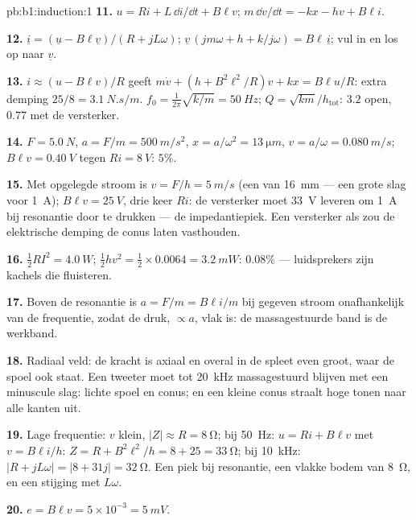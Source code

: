 \begin{solution}{pb:b1:induction:1}
\textbf{11.} $u = Ri + L\,\dd i/\dd t + B\ell v$; $m\,\dd v/\dd t = -kx - hv + B\ell i$.

\textbf{12.} $\underline i = (\underline u - B\ell\underline v)/(R + jL\omega)$; $\underline v\,(jm\omega + h +
k/j\omega) = B\ell\,\underline i$; vul in en los op naar $\underline v$.

\textbf{13.} $i \approx (u - B\ell v)/R$ geeft $m\dot v + (h + B^2\ell^2/R)v + kx =
B\ell u/R$: extra demping $25/8 = \qty{3.1}{N.s/m}$. $f_0 = \tfrac1{2\pi}\sqrt{k/m} =
\qty{50}{Hz}$; $Q = \sqrt{km}/h_{\text{tot}}$: $3.2$ open, $0.77$ met de
versterker.

\textbf{14.} $F = \qty{5.0}{N}$, $a = F/m = \qty{500}{m/s^2}$, $x = a/\omega^2 =
\qty{13}{\micro m}$, $v = a/\omega = \qty{0.080}{m/s}$; $B\ell v = \qty{0.40}{V}$ tegen
$Ri = \qty{8}{V}$: $5\%$.

\textbf{15.} Met opgelegde stroom is $v = F/h = \qty{5}{m/s}$ (een
 van \qty{16}{mm} --- een grote slag voor \qty{1}{A}); $B\ell v =
\qty{25}{V}$, drie keer $Ri$: de versterker moet \qty{33}{V} leveren om
\qty{1}{A} bij resonantie door te drukken --- de impedantiepiek. Een versterker als 
zou de elektrische demping de conus laten vasthouden.

\textbf{16.} $\tfrac12RI^2 = \qty{4.0}{W}$; $\tfrac12hv^2 = \tfrac12 \times 0.0064 =
\qty{3.2}{mW}$:  $0.08\%$ --- luidsprekers zijn kachels die
fluisteren.

\textbf{17.} Boven de resonantie is $a = F/m = B\ell i/m$ bij gegeven stroom
onafhankelijk van de frequentie, zodat de druk, $\propto a$, vlak is:
de massagestuurde band is de werkband.

\textbf{18.} Radiaal veld: de kracht is axiaal en overal in de spleet even
groot, waar de spoel ook staat. Een tweeter moet tot \qty{20}{kHz}
massagestuurd blijven met een minuscule slag: lichte spoel en conus; en een
kleine conus straalt hoge tonen naar alle kanten uit.

\textbf{19.} Lage frequentie: $v$ klein, $|Z| \approx R = \qty{8}{\ohm}$; bij
\qty{50}{Hz}: $u = Ri + B\ell v$ met $v = B\ell i/h$: $Z = R + B^2\ell^2/h = 8 + 25 =
\qty{33}{\ohm}$; bij \qty{10}{kHz}: $|R + jL\omega| = |8 + 31j| = \qty{32}{\ohm}$. Een
piek bij resonantie, een vlakke bodem van \qty{8}{\ohm}, en een stijging met $L\omega$.

\textbf{20.} $e = B\ell v = 5 \times 10^{-3} = \qty{5}{mV}$.


\end{solution}
